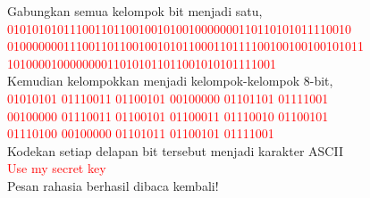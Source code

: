 \documentclass{article}
\begin{document}

Gabungkan semua kelompok bit menjadi satu,\\
\textcolor{red}{0101010101110011011001001010010000000110110101011110010}\\
\textcolor{red}{010000000111001101100100101011000110111100100100100101011}\\
\textcolor{red}{1010000100000000110101011011001010101111001}\\
\vspace{10mm}
Kemudian kelompokkan menjadi kelompok-kelompok 8-bit,\\
\textcolor{red}{01010101 01110011 01100101 00100000 01101101 01111001}\\
\textcolor{red}{00100000 01110011 01100101 01100011 01110010 01100101}\\
\textcolor{red}{01110100 00100000 01101011 01100101 01111001}\\
\vspace{10mm}
Kodekan setiap delapan bit tersebut menjadi karakter ASCII\\
\textcolor{red}{Use my secret key}\\
\vspace{10mm}
Pesan rahasia berhasil dibaca kembali!
\end{document}
